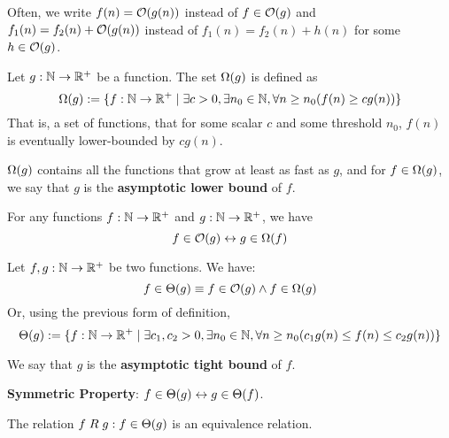 \begin{remark}
    Often, we write $f(n) = \mathcal{O}(g(n))$ instead of $f \in \mathcal{O}(g)$ and 
    $f_1(n) = f_2(n) + \mathcal{O}(g(n))$ instead of $f_1(n) = f_2(n) + h(n)$ for some $h \in \mathcal{O}(g)$.
\end{remark}

\begin{definition}
    Let $g:\mathbb{N}\to\mathbb{R}^+$ be a function. The set $\Omega(g)$ is defined as
    \[
        \Omega(g) := \{f:\mathbb{N}\to\mathbb{R}^+ \mid \exists c>0, \exists n_0\in\mathbb{N}, \forall n\geq n_0 (f(n) \geq c g(n))\}
    \]
    That is, a set of functions, that for some scalar $c$ and some threshold $n_0$,
    $f(n)$ is eventually lower-bounded by $c g(n)$.

    $\Omega(g)$ contains all the functions that grow at least as fast as $g$, and for $f\in\Omega(g)$,
    we say that $g$ is the \textbf{asymptotic lower bound} of $f$.
\end{definition}

\begin{theorem}
    For any functions $f:\mathbb{N}\to\mathbb{R}^+$ and $g:\mathbb{N}\to\mathbb{R}^+$, we have
    \[
        f \in \mathcal{O}(g) \leftrightarrow g \in \Omega(f)
    \]
\end{theorem}

\begin{definition}
    Let $f,g:\mathbb{N}\to\mathbb{R}^+$ be two functions. We have:
    \[
        f\in\Theta(g) \equiv f\in\mathcal{O}(g) \land f\in\Omega(g)
    \]
    Or, using the previous form of definition,
    \[
        \Theta(g) := \{f:\mathbb{N}\to\mathbb{R}^+ \mid \exists c_1, c_2 > 0, \exists n_0\in\mathbb{N}, \forall n\geq n_0 (c_1 g(n) \leq f(n) \leq c_2 g(n))\}
    \]

    We say that $g$ is the \textbf{asymptotic tight bound} of $f$.

    \textbf{Symmetric Property}: $f\in\Theta(g) \leftrightarrow g\in\Theta(f)$.
\end{definition}

\begin{remark}
    The relation $f\mathrel R g: f\in\Theta(g)$ is an equivalence relation.
\end{remark}